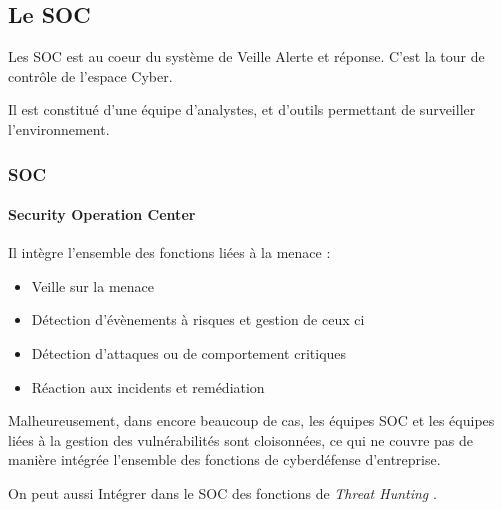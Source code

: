 
\subsection{Le SOC}

Les SOC est au coeur du système de Veille Alerte et réponse. C'est la tour de contrôle de l'espace Cyber.

Il est constitué d'une équipe d'analystes, et d'outils permettant de surveiller l'environnement.


\begin{frame}
\frametitle<presentation>{SOC}
\framesubtitle<presentation>{Security Operation Center}
Il intègre l'ensemble des fonctions liées à la menace :

\begin{itemize}
  \item Veille sur la menace
  \item Détection d'évènements à risques et gestion de ceux ci
  \item Détection d'attaques ou de comportement critiques
  \item Réaction aux incidents et remédiation

\end{itemize}
\end{frame}

Malheureusement, dans encore beaucoup de cas, les équipes SOC et les équipes liées à la gestion des vulnérabilités sont cloisonnées, ce qui ne couvre pas de manière intégrée l'ensemble des fonctions de cyberdéfense d'entreprise.

On peut aussi Intégrer dans  le SOC des fonctions de  \textit{Threat Hunting }.

